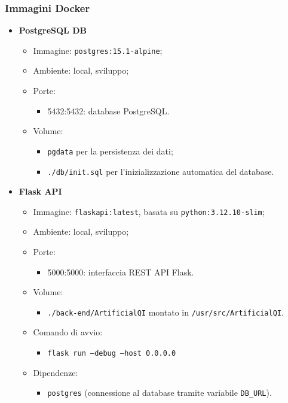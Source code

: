 \subsubsection{Immagini Docker}
\label{subsubsec:immagini_docker}
\begin{itemize}
  \item \textbf{PostgreSQL DB}
  \begin{itemize}
    \item Immagine: \texttt{postgres:15.1-alpine};
    \item Ambiente: local, sviluppo;
    \item Porte:
    \begin{itemize}
      \item 5432:5432: database PostgreSQL.
    \end{itemize}
    \item Volume:
    \begin{itemize}
      \item \texttt{pgdata} per la persistenza dei dati;
      \item \texttt{./db/init.sql} per l'inizializzazione automatica del database.
    \end{itemize}
  \end{itemize}

  \item \textbf{Flask API}
  \begin{itemize}
    \item Immagine: \texttt{flaskapi:latest}, basata su \texttt{python:3.12.10-slim};
    \item Ambiente: local, sviluppo;
    \item Porte:
    \begin{itemize}
      \item 5000:5000: interfaccia REST API Flask.
    \end{itemize}
    \item Volume:
    \begin{itemize}
      \item \texttt{./back-end/ArtificialQI} montato in \texttt{/usr/src/ArtificialQI}.
    \end{itemize}
    \item Comando di avvio:
    \begin{itemize}
      \item \texttt{flask run --debug --host 0.0.0.0}
    \end{itemize}
    \item Dipendenze:
    \begin{itemize}
      \item \texttt{postgres} (connessione al database tramite variabile \texttt{DB\_URL}).
    \end{itemize}
  \end{itemize}


\end{itemize}
